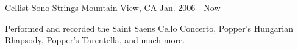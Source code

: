 \begin{cventries}
  \cventry
    {Cellist} %
    {Sono Strings} %
    {Mountain View, CA} %
    {Jan. 2006 - Now} %
    {
      \begin{cvitems} %
        \item {Performed and recorded the Saint Saens Cello Concerto, Popper's
		Hungarian Rhapsody, Popper's Tarentella, and much more.}
      \end{cvitems}
    }

\end{cventries}
